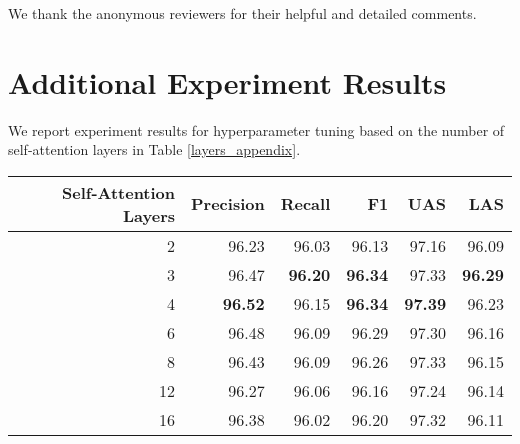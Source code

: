 \documentclass[11pt,a4paper]{article}
\begin{document}
We thank the anonymous reviewers for their helpful and detailed comments.




\appendix

\section{Additional Experiment Results}

We report experiment results for hyperparameter tuning based on the number of self-attention layers in Table \ref{layers_appendix}.

\begin{table*}[]
    \centering
    \begin{tabular}{|r|r|r|r|r|r|}
        \hline
\bf Self-Attention Layers & \bf Precision & \bf Recall & \bf F1 & \bf UAS & \bf LAS \\ \hline
        2  & 96.23 & 96.03 & 96.13 & 97.16 & 96.09 \\
        3  & 96.47 & \bf 96.20 & \bf 96.34 & 97.33 & \bf 96.29 \\
        4  & \bf 96.52 & 96.15 & \bf 96.34 & \bf 97.39 & 96.23 \\
        6  & 96.48 & 96.09 & 96.29 & 97.30 & 96.16 \\
        8  & 96.43 & 96.09 & 96.26 & 97.33 & 96.15 \\
        12 & 96.27 & 96.06 & 96.16 & 97.24 & 96.14 \\
        16 & 96.38 & 96.02 & 96.20 & 97.32 & 96.11 \\ \hline
    \end{tabular}
    \caption{Performance on the Penn Treebank test set of our LAL parser according to the number of self-attention layers. All parsers here include the Position-wise Feed-forward Layer and Residual Dropout.}
    \label{layers_appendix}
\end{table*}
\end{document}
